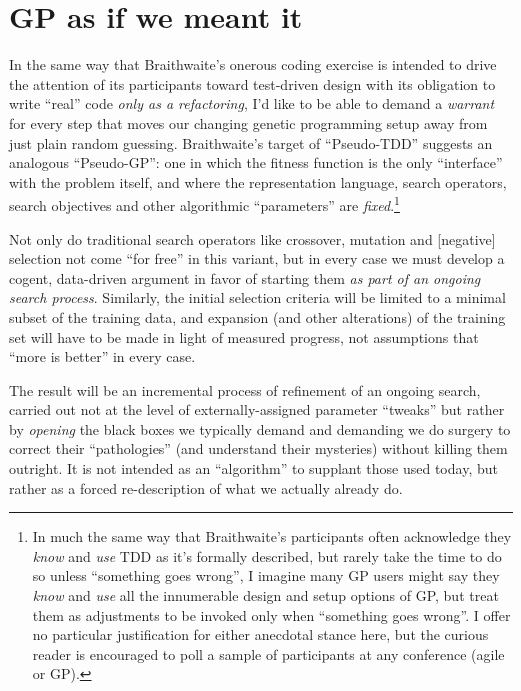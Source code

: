 \section{GP as if we meant it}\hypertarget{gp-as-if-we-meant-it}{}\label{gp-as-if-we-meant-it}

In the same way that Braithwaite's onerous coding exercise is intended to drive the attention of its participants toward test-driven design with its obligation to write ``real'' code \emph{only as a refactoring}, I'd like to be able to demand a \emph{warrant} for every step that moves our changing genetic programming setup away from just plain random guessing. Braithwaite's target of ``Pseudo-TDD'' suggests an analogous ``Pseudo-GP'': one in which the fitness function is the only ``interface'' with the problem itself, and where the representation language, search operators, search objectives and other algorithmic ``parameters'' are \emph{fixed}.\footnote{In much the same way that Braithwaite's participants often acknowledge they \emph{know} and \emph{use} TDD as it's formally described, but rarely take the time to do so unless ``something goes wrong'', I imagine many GP users might say they \emph{know} and \emph{use} all the innumerable design and setup options of GP, but treat them as adjustments to be invoked only when ``something goes wrong''. I offer no particular justification for either anecdotal stance here, but the curious reader is encouraged to poll a sample of participants at any conference (agile or GP).}

Not only do traditional search operators like crossover, mutation and [negative] selection not come ``for free'' in this variant, but in every case we must develop a cogent, data-driven argument in favor of starting them \emph{as part of an ongoing search process}. Similarly, the initial selection criteria will be limited to a minimal subset of the training data, and expansion (and other alterations) of the training set will have to be made in light of measured progress, not assumptions that ``more is better'' in every case.

The result will be an incremental process of refinement of an ongoing search, carried out not at the level of externally-assigned parameter ``tweaks'' but rather by \emph{opening} the black boxes we typically demand and demanding we do surgery to correct their ``pathologies'' (and understand their mysteries) without killing them outright. It is not intended as an ``algorithm'' to supplant those used today, but rather as a forced re-description of what we actually already do.

